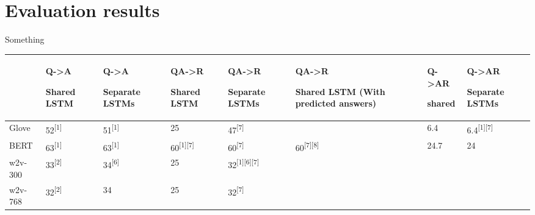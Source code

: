 \section{Evaluation results}
\label{sec:evaluation-results}

Something

\begin{table}
\centering

\begin{tabular}{| l | l | l | l | l | l | l | l |}
\hline
 & Q->A

Shared LSTM & Q->A

Separate LSTMs & QA->R

Shared LSTM & QA->R

Separate LSTMs & QA->R

Shared LSTM (With predicted answers) & Q->AR

shared & Q->AR

Separate LSTMs \\
\hline
Glove & 52\textsuperscript{[1]} & 51\textsuperscript{[1]} & 25& 47\textsuperscript{[7]} &  & 6.4 & 6.4\textsuperscript{[1][7]} \\
\hline
BERT & 63\textsuperscript{[1]} & 63\textsuperscript{[1]} & 60\textsuperscript{[1][7]} & 60\textsuperscript{[7]} & 60\textsuperscript{[7][8]} & 24.7 & 24 \\
\hline
w2v-300 & 33\textsuperscript{[2]} & 34\textsuperscript{[6]} & 25& 32\textsuperscript{[1][6][7]} &  &  &  \\
\hline
w2v-768 & 32\textsuperscript{[2]} & 34 & 25& 32\textsuperscript{[7]} &  &  &  \\
\hline

\end{tabular}

\end{table}


